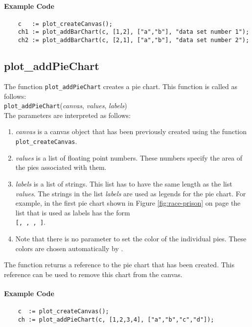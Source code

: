 \paragraph{Example Code}
\begin{verbatim}
    c   := plot_createCanvas();
    ch1 := plot_addBarChart(c, [1,2], ["a","b"], "data set number 1");
    ch2 := plot_addBarChart(c, [2,1], ["a","b"], "data set number 2");
\end{verbatim}

\subsection{plot\_addPieChart}
The function \texttt{plot\_addPieChart} creates a pie chart.
This function is called as follows:
\\[0.2cm]
\hspace*{1.3cm}
\texttt{plot\_addPieChart}(\textsl{canvas}, \textsl{values}, \textsl{labels})
\\[0.2cm]
The parameters are interpreted as follows:
\begin{enumerate}
\item \textsl{canvas} is a canvas object that has been previously created using the function
      \texttt{plot\_createCanvas}.  
\item \textsl{values} is a list of floating point numbers. These numbers specify the area of the
      pies associated with them.
\item \textsl{labels} is a list of strings.  This list has to have the same length as the list
      \textsl{values}.  The strings in the list \textsl{labels} are used as legends for the pie chart.
      For example, in the first pie chart shown in Figure \ref{fig:race-prison} on page
      \pageref{fig:race-prison} the list that is used as labels has the form
      \\[0.2cm]
      \hspace*{1.3cm}
      \texttt{[, , , ]}.
\item Note that there is no parameter to set the color of the individual pies.  
      These colors are chosen automatically by \setlx.
\end{enumerate}
The function returns a reference to the pie chart that has been created.  This reference can be used
to remove this chart from the canvas.

\paragraph{Example Code}
\begin{verbatim}
    c  := plot_createCanvas();
    ch := plot_addPieChart(c, [1,2,3,4], ["a","b","c","d"]);
\end{verbatim}


